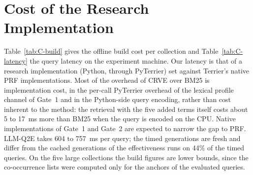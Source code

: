 \documentclass[10pt,a4paper]{article}
\newcommand{\method}{CRVE\xspace}
\begin{document}
\FloatBarrier
\section{Cost of the Research Implementation}\label{app:cost}

Table~\ref{tab:C-build} gives the offline build cost per collection and Table~\ref{tab:C-latency} the query latency on the experiment machine. Our latency is that of a research implementation (Python, through PyTerrier) set against Terrier's native PRF implementations. Most of the overhead of \method over BM25 is implementation cost, in the per-call PyTerrier overhead of the lexical profile channel of Gate~1 and in the Python-side query encoding, rather than cost inherent to the method: the retrieval with the five added terms itself costs about 5 to 17~ms more than BM25 when the query is encoded on the CPU. Native implementations of Gate~1 and Gate~2 are expected to narrow the gap to PRF. LLM-Q2E takes 604 to 757~ms per query; the timed generations are fresh and differ from the cached generations of the effectiveness runs on 44\% of the timed queries. On the five large collections the build figures are lower bounds, since the co-occurrence lists were computed only for the anchors of the evaluated queries.
\end{document}
